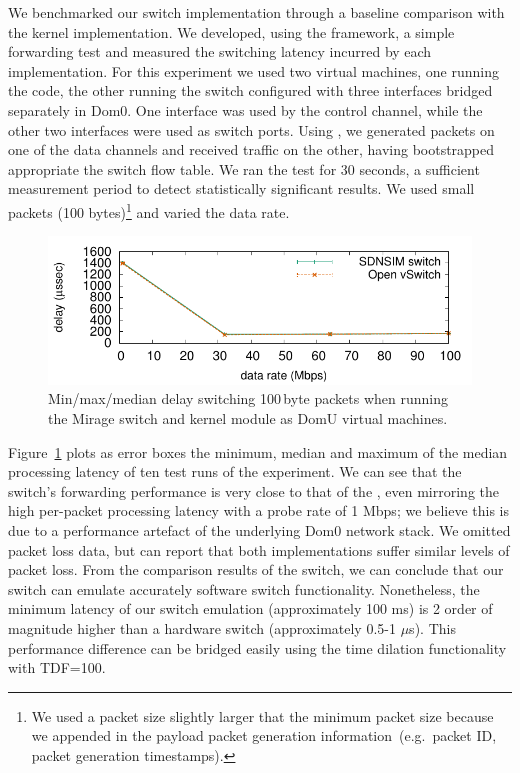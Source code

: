 We benchmarked our \mirage \of switch implementation through a baseline comparison
with the \ovs kernel implementation.  We developed, using
the \oflops framework, a simple forwarding test and measured the switching
latency incurred by each implementation.  For this experiment we used two virtual
machines, one running the \oflops code, the other running the \of switch
configured with three interfaces bridged separately in Dom0. One interface
was used by the \of control channel, while the other two interfaces were used as 
switch ports. Using \oflops, we generated packets on one of the data
channels and received traffic on the other, having bootstrapped appropriate the
switch flow table. We ran the test for 30 seconds, a sufficient measurement
period to detect statistically significant results. We used small packets
(100 bytes)\footnote{We used a packet size slightly larger that the minimum
  packet size because we appended in the payload packet generation
  information~(e.g.~packet ID, packet generation timestamps).} and varied the data
rate.

\begin{figure}
\centering
\includegraphics[width=\columnwidth]{Chapter1/Chapter1Figs/switch-media-delay}
\caption[\of switch data pane evaluation]{\label{fig:switch}Min/max/median
delay switching 100\,byte packets when running the Mirage switch and \ovs
kernel module as DomU virtual machines.}
\end{figure}

Figure~\ref{fig:switch} plots as error boxes the minimum, median and maximum of the
median processing latency of ten test runs of the experiment. We can see that
the \mirage switch's forwarding performance is very close to that of the \ovs,
even mirroring the high per-packet processing latency with a probe rate of
1 Mbps; we believe this is due to a performance artefact of the underlying Dom0
network stack. We omitted packet loss data, but can report that both implementations
suffer similar levels of packet loss.  From the comparison results of the
\mirage \of switch, we can conclude that our \of switch can emulate accurately
software switch functionality. Nonetheless, the minimum latency of our switch
emulation (approximately 100 ms) is 2 order of magnitude higher than a
hardware switch (approximately 0.5-1 $\mu$s). This performance difference can
be bridged easily using the time dilation functionality with TDF=100.

